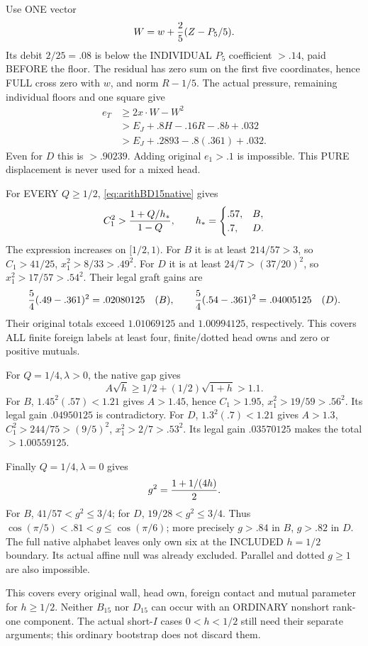 \documentclass[11pt]{article}
\begin{document}
Use ONE vector
\[
                         W=w+{2\over5}(Z-P_5/5).
\]
Its debit \(2/25=.08\) is below the INDIVIDUAL
\(P_5\) coefficient \(>.14\), paid BEFORE the floor.
The residual has zero sum on the first five coordinates,
hence FULL cross zero with \(w\), and norm \(R-1/5\).
The actual pressure, remaining individual floors and
one square give
\[
 \begin{split}
 e_T&\ge2x\cdot W-W^2\\
    &>E_J+.8H-.16R-.8b+.032\\
    &>E_J+.2893-.8(.361)+.032 .
 \end{split}
\]
Even for \(D\) this is \(>.90239\).
Adding original \(e_1>.1\) is impossible.
This PURE displacement is never used for a mixed head.

For EVERY \(Q\ge1/2\),
\eqref{eq:arithBD15native} gives
\[
 C_1^2>{1+Q/h_*\over1-Q},\qquad
 h_*=\begin{cases}.57,&B,\\ .7,&D.\end{cases}
\]
The expression increases on \([1/2,1)\).
For \(B\) it is at least \(214/57>3\),
so \(C_1>41/25\), \(x_1^2>8/33>.49^2\).
For \(D\) it is at least \(24/7>(37/20)^2\),
so \(x_1^2>17/57>.54^2\).
Their legal graft gains are
\[
 {5\over4}(.49-.361)^2=.02080125\quad(B),\qquad
 {5\over4}(.54-.361)^2=.04005125\quad(D).
\]
Their original totals exceed \(1.01069125\)
and \(1.00994125\), respectively.
This covers ALL finite foreign labels at least four,
finite/dotted head owns and zero or positive mutuals.

For \(Q=1/4,\lambda>0\), the native gap gives
\[
                 A\sqrt h\ge1/2+(1/2)\sqrt{1+h}>1.1 .
\]
For \(B\), \(1.45^2(.57)<1.21\) gives \(A>1.45\),
hence \(C_1>1.95\), \(x_1^2>19/59>.56^2\).
Its legal gain \(.04950125\) is contradictory.
For \(D\), \(1.3^2(.7)<1.21\) gives \(A>1.3\),
\(C_1^2>244/75>(9/5)^2\), \(x_1^2>2/7>.53^2\).
Its legal gain \(.03570125\) makes the total
\(>1.00559125\).

Finally \(Q=1/4,\lambda=0\) gives
\[
                         g^2={1+1/(4h)\over2}.
\]
For \(B\), \(41/57<g^2\le3/4\);
for \(D\), \(19/28<g^2\le3/4\).
Thus
\(\cos(\pi/5)<.81<g\le\cos(\pi/6)\);
more precisely \(g>.84\) in \(B\), \(g>.82\) in \(D\).
The full native alphabet leaves only own six at the
INCLUDED \(h=1/2\) boundary.
Its actual affine null was already excluded.
Parallel and dotted \(g\ge1\) are also impossible.

This covers every original wall, head own, foreign
contact and mutual parameter for \(h\ge1/2\).
Neither \(B_{15}\) nor \(D_{15}\) can occur with an
ORDINARY nonshort rank-one component.
The actual short-\(I\) cases \(0<h<1/2\) still need
their separate arguments; this ordinary bootstrap
does not discard them.
\end{document}
